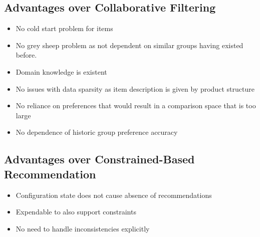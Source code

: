 \documentclass{article}
\begin{document}
\subsection{Advantages over Collaborative Filtering}
\begin{itemize}
    \item No cold start problem for items
    \item No grey sheep problem as not dependent on similar groups having existed before.
    \item Domain knowledge is existent
    \item No issues with data sparsity as item description is given by product structure
    \item No reliance on preferences that would result in a comparison space that is too large
    \item No dependence of historic group preference accuracy 
\end{itemize}

\subsection{Advantages over Constrained-Based Recommendation}

\begin{itemize}
    \item Configuration state does not cause absence of recommendations
    \item Expendable to also support constraints 
    \item No need to handle inconsistencies explicitly
\end{itemize}
\end{document}
